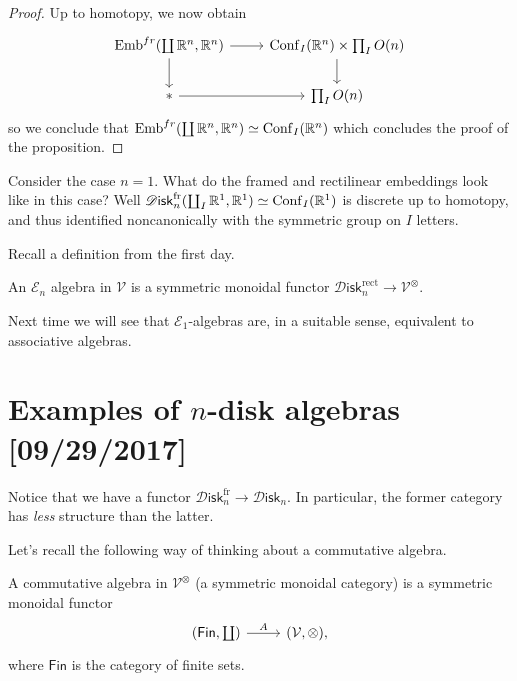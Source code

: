 \documentclass{amsart}
\DeclareMathOperator{\Emb}{Emb}
\DeclareMathOperator{\Conf}{Conf}
\newcommand{\Disk}{\mathscr{D}\mathsf{isk}_n}
\newcommand{\Diskf}{\mathscr{D}\mathsf{isk}_n^\text{fr}}
\newcommand{\Diskr}{\mathscr{D}\mathsf{isk}_n^\text{rect}}
\begin{document}
\begin{proof}
    Up to homotopy, we now obtain
    \begin{equation*}
        \begin{tikzcd}
            \Emb^{fr}(\coprod\R^n,\R^n) \rar\dar & \Conf_I(\R^n)\times \prod_I O(n)\dar \\
            * \rar & \prod_I O(n)
        \end{tikzcd}
    \end{equation*}
    so we conclude that $\Emb^{fr}(\coprod\R^n,\R^n)\simeq \Conf_I(\R^n)$ which concludes
    the proof of the proposition.
\end{proof}

\begin{example}
    Consider the case $n=1$. What do the framed and rectilinear embeddings look like in this case?
    Well $\Diskf(\coprod_I\R^1,\R^1)\simeq \Conf_I(\R^1)$ is discrete up to
    homotopy, and thus identified noncanonically with the symmetric group on $I$ letters.
\end{example}

Recall a definition from the first day.
\begin{definition}
    An $\mathcal{E}_n$ algebra in $\mathcal{V}$ is a symmetric monoidal functor
    $\Diskr \to \mathcal{V}^\otimes$.
\end{definition}
Next time we will see that $\mathcal{E}_1$-algebras are, in a suitable sense,
equivalent to associative algebras.

\newpage

\section{Examples of $n$-disk algebras [09/29/2017]}

Notice that we have a functor $\Diskf\to \Disk$. In particular, the former
category has \textit{less} structure than the latter.

Let's recall the following way of thinking about a commutative algebra.
\begin{definition}
    A commutative algebra in $\mathcal{V}^\otimes$ (a symmetric monoidal category) is
    a symmetric monoidal functor
    \begin{equation*}
        \begin{tikzcd}
            (\mathsf{Fin},\coprod) \rar{A} & (\mathcal{V},\otimes),
        \end{tikzcd}
    \end{equation*}
    where $\mathsf{Fin}$ is the category of finite sets.
\end{definition}
\end{document}
